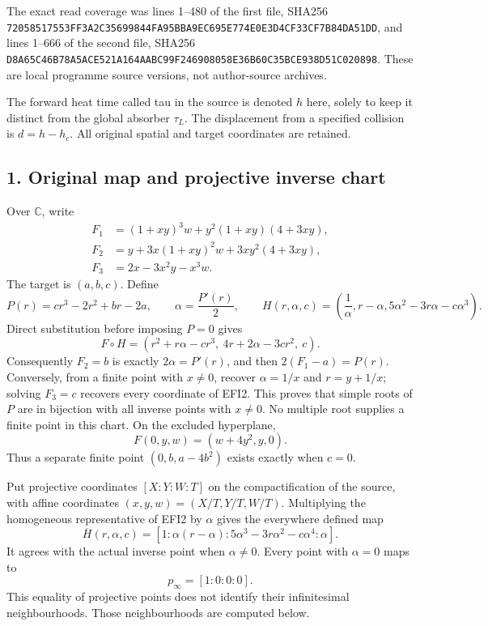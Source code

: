 \documentclass[
  10pt,
  a4paper,
]{article}
\begin{document}
The exact read coverage was lines 1--480 of the first file, SHA256
\texttt{72058517\allowbreak{}553FF3A2\allowbreak{}C3569984\allowbreak{}4FA95BBA\allowbreak{}9EC695E7\allowbreak{}74E0E3D4\allowbreak{}CF33CF7B\allowbreak{}84DA51DD},
and lines 1--666 of the second file, SHA256
\texttt{D8A65C46\allowbreak{}B78A5ACE\allowbreak{}521A164A\allowbreak{}ABC99F24\allowbreak{}6908058E\allowbreak{}36B60C35\allowbreak{}BCE938D5\allowbreak{}1C020898}.
These are local programme source versions, not author-source archives.

The forward heat time called tau in the source is denoted \(h\) here,
solely to keep it distinct from the global absorber \(\tau_L\). The
displacement from a specified collision is \(d=h-h_c\). All original
spatial and target coordinates are retained.

\subsection{1. Original map and projective inverse
chart}\label{original-map-and-projective-inverse-chart}

Over \(\mathbb C\), write \[
\begin{aligned}
F_1&=(1+xy)^3w+y^2(1+xy)(4+3xy),\\
F_2&=y+3x(1+xy)^2w+3xy^2(4+3xy),\\
F_3&=2x-3x^2y-x^3w.
\end{aligned}
\tag{EFI1}
\] The target is \((a,b,c)\). Define \[
P(r)=cr^3-2r^2+br-2a,\qquad
\alpha=\frac{P'(r)}2,\qquad
H(r,\alpha,c)=\left(\frac1\alpha,r-\alpha,
5\alpha^2-3r\alpha-c\alpha^3\right).
\tag{EFI2}
\] Direct substitution before imposing \(P=0\) gives \[
F\circ H=(r^2+r\alpha-cr^3,\ 4r+2\alpha-3cr^2,\ c).
\tag{EFI3}
\] Consequently \(F_2=b\) is exactly \(2\alpha=P'(r)\), and then
\(2(F_1-a)=P(r)\). Conversely, from a finite point with \(x\ne0\),
recover \(\alpha=1/x\) and \(r=y+1/x\); solving \(F_3=c\) recovers every
coordinate of EFI2. This proves that simple roots of \(P\) are in
bijection with all inverse points with \(x\ne0\). No multiple root
supplies a finite point in this chart. On the excluded hyperplane, \[
F(0,y,w)=(w+4y^2,y,0).
\tag{EFI4}
\] Thus a separate finite point \((0,b,a-4b^2)\) exists exactly when
\(c=0\).

Put projective coordinates \([X:Y:W:T]\) on the compactification of the
source, with affine coordinates \((x,y,w)=(X/T,Y/T,W/T)\). Multiplying
the homogeneous representative of EFI2 by \(\alpha\) gives the
everywhere defined map \[
\overline H(r,\alpha,c)=
[1:\alpha(r-\alpha):5\alpha^3-3r\alpha^2-c\alpha^4:\alpha].
\tag{EFI5}
\] It agrees with the actual inverse point when \(\alpha\ne0\). Every
point with \(\alpha=0\) maps to \[
p_\infty=[1:0:0:0].
\tag{EFI6}
\] This equality of projective points does not identify their
infinitesimal neighbourhoods. Those neighbourhoods are computed below.
\end{document}
